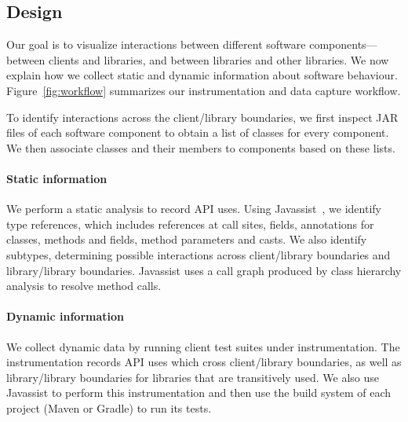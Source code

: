 \subsection{Design}
\label{subsec:collecting-data}
Our goal is to visualize interactions between different software components---between
clients and libraries, and between libraries and other libraries. We now explain
how we collect static and dynamic information about software behaviour.
Figure~\ref{fig:workflow} summarizes our instrumentation and
data capture workflow. 

To identify interactions across the client/library boundaries,
we first inspect JAR files of each software component to obtain a list of
classes for every component. We then associate classes and their members to
components based on these lists.

\paragraph{Static information} We perform a static analysis to record
API uses. Using Javassist~\cite{chiba00:_load_struc_reflec_java}, we identify type
references, which includes references at call sites, fields, annotations for 
classes, methods and fields, method parameters and casts. 
We also identify subtypes, determining possible 
interactions across client/library boundaries and library/library boundaries.
Javassist uses
a call graph produced by class hierarchy analysis to resolve method calls.

\paragraph{Dynamic information} We collect dynamic data by running client
test suites under instrumentation. 
The instrumentation records API
uses which cross client/library boundaries, as well as library/library boundaries
for libraries that are transitively used. We also use
Javassist to perform this
instrumentation and then use the build system of each project (Maven or Gradle) to run its
tests. 



